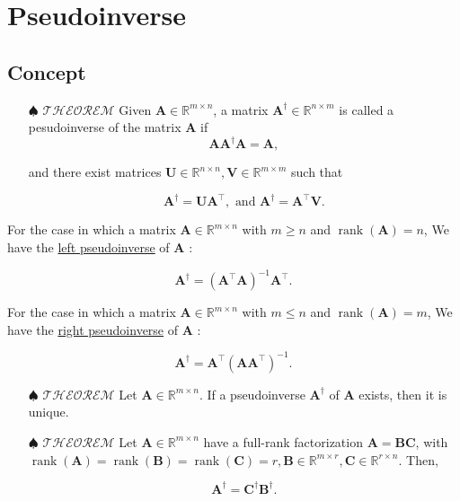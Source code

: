 \section{Pseudoinverse}

\subsection{Concept}
\begin{itemize} 
	\item[\(\spadesuit\)] \(\mathscr{THEOREM}\) Given \(\boldsymbol{A} \in \mathbb{R}^{m \times n}\), a matrix \(\boldsymbol{A}^{\dagger} \in \mathbb{R}^{n \times m}\) is called a pesudoinverse of the matrix \(\boldsymbol{A}\) if
	\[
		\boldsymbol{A} \boldsymbol{A}^{\dagger} \boldsymbol{A}=\boldsymbol{A},
	\]

	and there exist matrices \(\boldsymbol{U} \in \mathbb{R}^{n \times n}, \boldsymbol{V} \in \mathbb{R}^{m \times m}\) such that

	\[
		\boldsymbol{A}^{\dagger}=\boldsymbol{U} \boldsymbol{A}^{\top}, \text { and } \boldsymbol{A}^{\dagger}=\boldsymbol{A}^{\top} \boldsymbol{V} .
	\]

\end{itemize}

For the case in which a matrix \(\boldsymbol{A} \in \mathbb{R}^{m \times n}\) with \(m \geq n\) and \(\operatorname{rank}(\boldsymbol{A})=n\), We have the \underline{left pseudoinverse} of \(\boldsymbol{A}\) :

\[
	\boldsymbol{A}^{\dagger}=\left(\boldsymbol{A}^{\top} \boldsymbol{A}\right)^{-1} \boldsymbol{A}^{\top} .
\]

For the case in which a matrix \(\boldsymbol{A} \in \mathbb{R}^{m \times n}\) with \(m \leq n\) and \(\operatorname{rank}(\boldsymbol{A})=m\), We have the \underline{right pseudoinverse} of \(\boldsymbol{A}\) :

\[
	\boldsymbol{A}^{\dagger}=\boldsymbol{A}^{\top}\left(\boldsymbol{A} \boldsymbol{A}^{\top}\right)^{-1} .
\]

\begin{itemize}
	\item[\(\spadesuit\)] \(\mathscr{THEOREM}\) Let \(\boldsymbol{A} \in \mathbb{R}^{m \times n}\). If a pseudoinverse \(\boldsymbol{A}^{\dagger}\) of \(\boldsymbol{A}\) exists, then it is unique.

	\item[\(\spadesuit\)] \(\mathscr{THEOREM}\) Let \(\boldsymbol{A} \in \mathbb{R}^{m \times n}\) have a full-rank factorization \(\boldsymbol{A}=\boldsymbol{B} \boldsymbol{C}\), with \(\operatorname{rank}(\boldsymbol{A})=\operatorname{rank}(\boldsymbol{B})=\operatorname{rank}(\boldsymbol{C})=r, \boldsymbol{B} \in \mathbb{R}^{m \times r}, \boldsymbol{C} \in \mathbb{R}^{r \times n}\). Then,

	\[
		\boldsymbol{A}^{\dagger}=\boldsymbol{C}^{\dagger} \boldsymbol{B}^{\dagger} .
	\]
\end{itemize}



